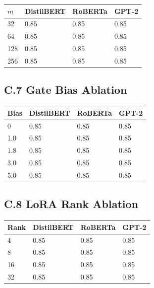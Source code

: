 \begin{table}[H]
\centering
\small
\begin{tabular}{llll}
\toprule
\textbf{$m$} & \textbf{DistilBERT} & \textbf{RoBERTa} & \textbf{GPT-2} \\
\midrule
32 & 0.85 & 0.85 & 0.85 \\
64 & 0.85 & 0.85 & 0.85 \\
128 & 0.85 & 0.85 & 0.85 \\
256 & 0.85 & 0.85 & 0.85 \\
\bottomrule
\end{tabular}
\end{table}

\subsection{C.7 Gate Bias Ablation}

\begin{table}[H]
\centering
\small
\begin{tabular}{llll}
\toprule
\textbf{Bias} & \textbf{DistilBERT} & \textbf{RoBERTa} & \textbf{GPT-2} \\
\midrule
0 & 0.85 & 0.85 & 0.85 \\
1.0 & 0.85 & 0.85 & 0.85 \\
1.8 & 0.85 & 0.85 & 0.85 \\
3.0 & 0.85 & 0.85 & 0.85 \\
5.0 & 0.85 & 0.85 & 0.85 \\
\bottomrule
\end{tabular}
\end{table}

\subsection{C.8 LoRA Rank Ablation}

\begin{table}[H]
\centering
\small
\begin{tabular}{llll}
\toprule
\textbf{Rank} & \textbf{DistilBERT} & \textbf{RoBERTa} & \textbf{GPT-2} \\
\midrule
4 & 0.85 & 0.85 & 0.85 \\
8 & 0.85 & 0.85 & 0.85 \\
16 & 0.85 & 0.85 & 0.85 \\
32 & 0.85 & 0.85 & 0.85 \\
\bottomrule
\end{tabular}
\end{table}

